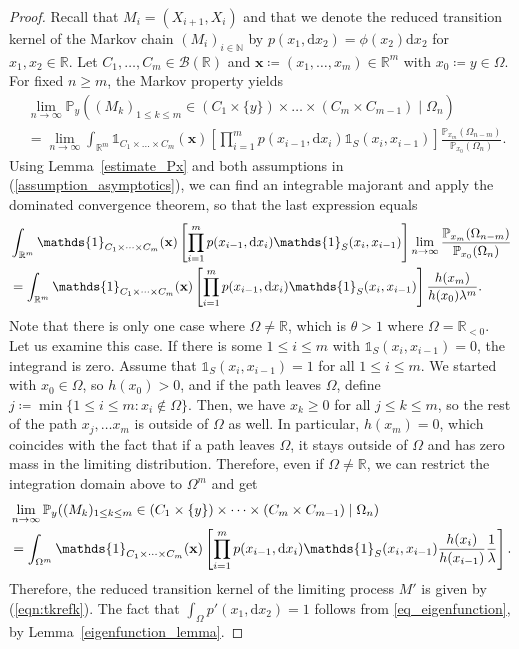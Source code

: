 \documentclass[12pt]{article}
\newcommand{\N}{\mathbb{N}} %
\newcommand{\R}{\mathbb{R}} %
\renewcommand{\P}{\mathbb{P}} %
\newcommand{\1}{\mathds{1}}
\renewcommand{\d}{\mathrm{d}}
\theoremstyle{definition}
\theoremstyle{plain}
\theoremstyle{remark}
\begin{document}
\begin{proof} Recall that $M_i=(X_{i+1},X_i)$ and that we denote the reduced transition kernel of the Markov chain $(M_i)_{i\in\N}$ by $p(x_1,\d x_2)=\phi(x_2)\d x_2$ for $x_1, x_2\in\R$. Let $C_1,\dots, C_m\in\mathcal{B}(\R)$ and $\mathbf{x}\coloneqq(x_1,\dots,x_m)\in \R^m$ with $x_0\coloneqq y\in\Omega$. For fixed $n\ge m$, the Markov property yields
\begin{align*}
     &\lim_{n\to\infty}\P_{y}((M_k)_{1\leq k\leq m}\in (C_1\times\{y\})\times\dots\times (C_m\times C_{m-1})\mid \Omega_n)   \\&=\lim_{n\to\infty}\int_{\R^m}\1_{C_1\times\dots\times C_m}(\mathbf{x})\left[\prod_{i=1}^m p(x_{i-1},\d x_i)\mathds{1}_S(x_i,x_{i-1})\right]\frac{\P_{x_m}(\Omega_{n-m})}{\P_{x_0}(\Omega_n)} .
\end{align*}
Using Lemma~\ref{estimate_Px} and both assumptions in (\ref{assumption_asymptotics}), we can find an integrable majorant and apply the dominated convergence theorem, so that the last expression equals
\begin{align}
    &
    \int_{\R^m}\1_{C_1\times\dots\times C_m}(\mathbf{x})\left[\prod_{i=1}^m p(x_{i-1},\d x_i)\mathds{1}_S(x_i,x_{i-1})\right]\lim_{n\to\infty}\frac{\P_{x_m}(\Omega_{n-m})}{\P_{x_0}(\Omega_n)}  \notag
    \\&=\int_{\R^m}\1_{C_1\times\dots\times C_m}(\mathbf{x})\left[\prod_{i=1}^m p(x_{i-1},\d x_i)\mathds{1}_S(x_i,x_{i-1})\right]\frac{h(x_m)}{h(x_0)\lambda^m}.\notag
\end{align}
Note that there is only one case where $\Omega\ne \R$, which is $\theta>1$ where $\Omega=\R_{<0}$. Let us examine this case. If there is some $1\le i\le m$ with  $\mathds{1}_S(x_i,x_{i-1})=0$, the integrand is zero. Assume that $\mathds{1}_S(x_i,x_{i-1})=1$ for all $1\le i\le m$. We started with $x_0\in\Omega$, so $h(x_0)>0$, and if the path leaves $\Omega$, define $j\coloneqq\min\{1\leq i\leq m:x_i\notin\Omega\}$. Then, we have $x_{k}\ge0$ for all $j\le k\le m$, so the rest of the path $x_{j},\dots x_m$ is outside of $\Omega$ as well. In particular, $h(x_m)=0$, which coincides with the fact that if a path leaves $\Omega$, it stays outside of $\Omega$ and has zero mass in the limiting distribution. Therefore, even if $\Omega\neq \R$, we can restrict the integration domain above to $\Omega^m$ and get
\begin{align}
    &\lim_{n\to\infty}\P_{y}((M_k)_{1\leq k\leq m}\in (C_1\times\{y\})\times\dots\times (C_m\times C_{m-1})\mid \Omega_n)\notag
    \\&=\int_{\Omega^m}\1_{C_1\times\dots\times C_m}(\mathbf{x})\left[\prod_{i=1}^m p(x_{i-1},\d x_i)\mathds{1}_S(x_i,x_{i-1})\frac{h(x_i)}{h(x_{i-1})}\frac{1}{\lambda}\right].\notag
\end{align}
Therefore, the reduced transition kernel of the limiting process $M'$ is given by (\ref{eqn:tkrefk}).
The fact that $\int_\Omega p'(x_1,\d x_2) =1$ follows from \eqref{eq_eigenfunction}, by Lemma~\ref{eigenfunction_lemma}.
\end{proof}
\end{document}
